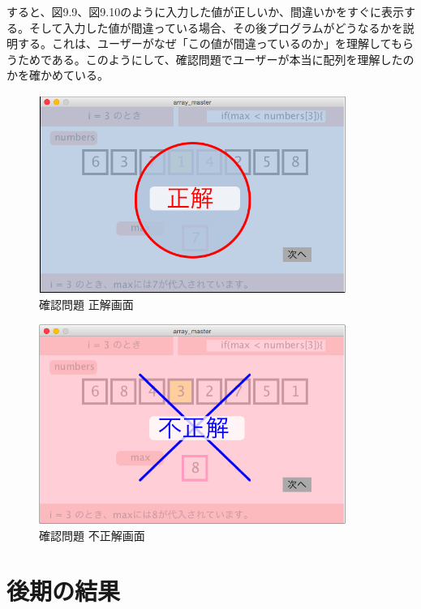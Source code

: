 \documentclass[openany,11pt,papersize]{jsbook}
\begin{document}
すると、図9.9、図9.10のように入力した値が正しいか、間違いかをすぐに表示する。そして入力した値が間違っている場合、その後プログラムがどうなるかを説明する。これは、ユーザーがなぜ「この値が間違っているのか」を理解してもらうためである。このようにして、確認問題でユーザーが本当に配列を理解したのかを確かめている。


\begin{figure}[H]
\begin{center}
\includegraphics[width=10cm, bb=0 0 645 418]{img/9thParagraph/kakuninmondai_05.png}
\end{center}
\caption{確認問題 正解画面}
\end{figure}

\begin{figure}[H]
\begin{center}
\includegraphics[width=10cm, bb=0 0 644 419]{img/9thParagraph/kakuninmondai_06.png}
\end{center}
\caption{確認問題 不正解画面}
\end{figure}



\chapter{後期の結果}
\end{document}
